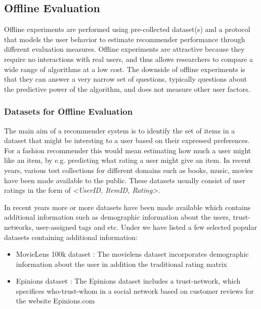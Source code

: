 \subsection{Offline Evaluation}

Offline experiments are performed using pre-collected dataset(s) and a protocol that models the user behavior to estimate recommender performance through different evaluation measures. Offline experiments are attractive because they require no interactions with real users, and thus allows researchers to compare a wide range of algorithms at a low cost. The downside of offline experiments is that they can answer a very narrow set of questions, typically questions about the predictive power of the algorithm, and does not measure other user factors.

\subsubsection{Datasets for Offline Evaluation}

The main aim of a recommender system is to identify the set of items in a dataset that might be intersting to a user based on their expressed preferences. For a fashion recommender this would mean estimating how much a user might like an item, by e.g. predicting what rating a user might give an item. In recent years, various test collections for different domains such as books, music, movies have been made available to the public. These datasets usually consist of user ratings in the form of \emph{<UserID, ItemID, Rating>}.

In recent years more or more datasets have been made available which contains additional information such as demographic information about the users, trust-networks, user-assigned tags and etc. Under we have listed a few selected popular datasets containing additional information:


\begin{itemize}
\item MovieLens 100k dataset \cite{Movielens}: The movielens dataset incorporates demographic information about the user in addition the traditional rating matrix
\item Epinions dataset \cite{Epinions}: The Epinions dataset includes a trust-network, which specifices who-trust-whom in a social network based on customer reviews for the website Epinions.com
\end{itemize}

